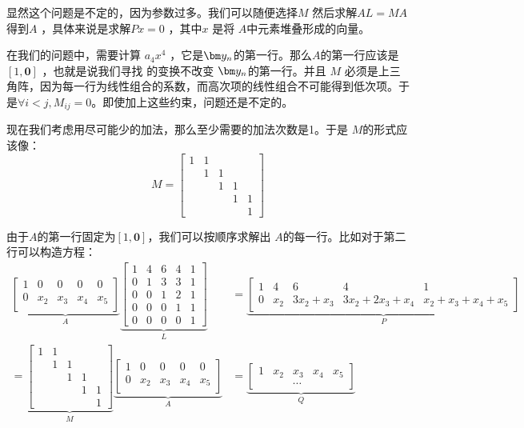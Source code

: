 显然这个问题是不定的，因为参数过多。我们可以随便选择$M$ 然后求解$AL=MA$ 得到$A$ ，具体来说是求解$Px=0$ ，其中$x$ 是将 $A$中元素堆叠形成的向量。

在我们的问题中，需要计算 $a_4x^4$ ，它是$\by_n$的第一行。那么$A$的第一行应该是$[1,\bm{0}]$ ，也就是说我们寻找 的变换不改变 $\by_n$的第一行。并且 $M$ 必须是上三角阵，因为每一行为线性组合的系数，而高次项的线性组合不可能得到低次项。于是$\forall i<j, M_{ij}=0$。即使加上这些约束，问题还是不定的。 

现在我们考虑用尽可能少的加法，那么至少需要的加法次数是1。于是 $M$的形式应该像：
\[M=\begin{bmatrix}
	1 & 1 &  &  &  \\
	& 1& 1& &\\
	& & 1& 1& \\
	& & & 1& 1\\
	& & & & 1
\end{bmatrix}\]

由于$A$的第一行固定为$[1,\bm{0}]$，我们可以按顺序求解出 $A$的每一行。比如对于第二行可以构造方程：
$$\begin{aligned}
	\underbrace{\begin{bmatrix}
			1 & 0 & 0 & 0& 0\\
			0 & x_2 & x_3 & x_4 &x_5\\
	\end{bmatrix}}_{A}\underbrace{\begin{bmatrix}
			1 & 4 & 6 & 4 &1\\
			0& 1 & 3 &3 &1 \\
			0& 0& 1 & 2 & 1\\
			0& 0&0& 1&1\\
			0& 0& 0& 0& 1
	\end{bmatrix}}_{L}&=\underbrace{\begin{bmatrix}
			1 & 4 & 6 & 4 &1\\
			0& x_2& 3x_2+x_3&3x_2+2x_3+x_4&x_2+x_3+x_4+x_5
	\end{bmatrix}}_{P}\\
	=\underbrace{\begin{bmatrix}
			1 & 1 &  &  &  \\
			& 1& 1& &\\
			& & 1& 1& \\
			& & & 1& 1\\
			& & & & 1
	\end{bmatrix}}_{M}\underbrace{\begin{bmatrix}
			1 & 0 & 0 & 0& 0\\
			0& x_2 & x_3 & x_4 &x_5\\
	\end{bmatrix}}_{A}&=\underbrace{\begin{bmatrix}
			1 & x_2 & x_3 & x_4 &x_5\\
			& & \cdots & & 
	\end{bmatrix}}_{Q}
\end{aligned}
$$

